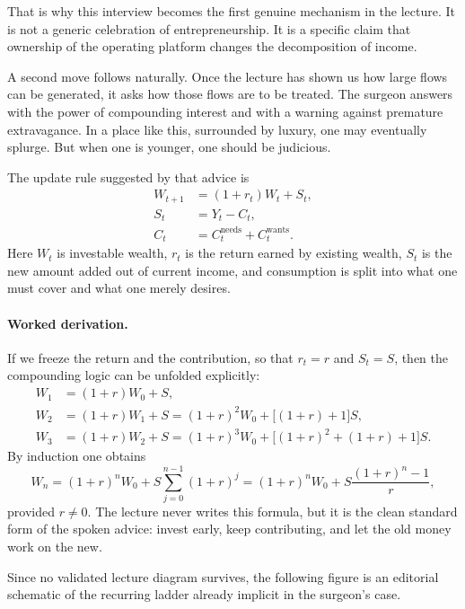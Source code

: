 That is why this interview becomes the first genuine mechanism in the lecture. It is not a generic celebration of entrepreneurship. It is a specific claim that ownership of the operating platform changes the decomposition of income.

A second move follows naturally. Once the lecture has shown us how large flows can be generated, it asks how those flows are to be treated. The surgeon answers with the power of compounding interest and with a warning against premature extravagance. In a place like this, surrounded by luxury, one may eventually splurge. But when one is younger, one should be judicious.

The update rule suggested by that advice is
\begin{align}
W_{t+1} &= (1+r_t)W_t + S_t,\\
S_t &= Y_t - C_t,\\
C_t &= C_t^{\text{needs}} + C_t^{\text{wants}}.
\end{align}
Here \(W_t\) is investable wealth, \(r_t\) is the return earned by existing wealth, \(S_t\) is the new amount added out of current income, and consumption is split into what one must cover and what one merely desires.

\paragraph{Worked derivation.}
If we freeze the return and the contribution, so that \(r_t=r\) and \(S_t=S\), then the compounding logic can be unfolded explicitly:
\begin{align}
W_1 &= (1+r)W_0 + S,\\
W_2 &= (1+r)W_1 + S = (1+r)^2W_0 + \bigl[(1+r)+1\bigr]S,\\
W_3 &= (1+r)W_2 + S = (1+r)^3W_0 + \bigl[(1+r)^2+(1+r)+1\bigr]S.
\end{align}
By induction one obtains
\begin{equation}
W_n = (1+r)^n W_0 + S\sum_{j=0}^{n-1}(1+r)^j
     = (1+r)^n W_0 + S\frac{(1+r)^n-1}{r},
\end{equation}
provided \(r\neq 0\). The lecture never writes this formula, but it is the clean standard form of the spoken advice: invest early, keep contributing, and let the old money work on the new.

Since no validated lecture diagram survives, the following figure is an editorial schematic of the recurring ladder already implicit in the surgeon's case.

